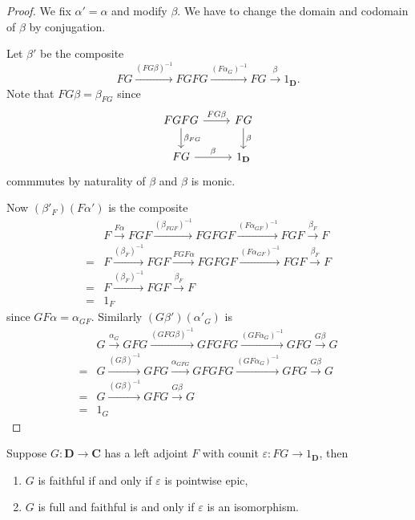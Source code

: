\documentclass[a4paper]{article}
\renewcommand{\c}[1]{\mathbf{#1}}
\begin{document}
\begin{proof}
  We fix \(\alpha' = \alpha\) and modify \(\beta\). We have to change the domain and codomain of \(\beta\) by conjugation.

  Let \(\beta'\) be the composite
  \[
    FG \xrightarrow{(FG\beta)^{-1}} FGFG \xrightarrow{(F\alpha_G)^{-1}} FG \xrightarrow{\beta} 1_{\c D}.
  \]
  Note that \(FG\beta = \beta_{FG}\) since
  \[
    \begin{tikzcd}
      FGFG \ar[r, "FG\beta"] \ar[d, "\beta_{FG}"] & FG \ar[d, "\beta"] \\
      FG \ar[r, "\beta"] & 1_{\c D}
    \end{tikzcd}
  \]
  commmutes by naturality of \(\beta\) and \(\beta\) is monic.

  Now \((\beta'_F)(F\alpha')\) is the composite
   \begin{align*}
     &F \xrightarrow{F\alpha} FGF \xrightarrow{(\beta_{FGF})^{-1}} FGFGF \xrightarrow{(F\alpha_{GF})^{-1}} FGF \xrightarrow{\beta_F} F \\
     =& F \xrightarrow{(\beta_F)^{-1}} FGF \xrightarrow{FGF\alpha} FGFGF \xrightarrow{(F\alpha_{GF})^{-1}} FGF \xrightarrow{\beta_F} F \\
     =& F \xrightarrow{(\beta_F)^{-1}} FGF \xrightarrow{\beta_F} F \\
     =& 1_F
   \end{align*}
  since \(GF \alpha = \alpha_{GF}\). Similarly \((G\beta')(\alpha'_G)\) is
  \begin{align*}
    &G \xrightarrow{\alpha_G} GFG \xrightarrow{(GFG\beta)^{-1}} GFGFG \xrightarrow{(GF\alpha_G)^{-1}} GFG \xrightarrow{G\beta} G \\
    =& G \xrightarrow{(G\beta)^{-1}} GFG \xrightarrow{\alpha_{GFG}} GFGFG \xrightarrow{(GF\alpha_G)^{-1}} GFG \xrightarrow{G\beta} G \\
    =& G \xrightarrow{(G\beta)^{-1}} GFG \xrightarrow{G\beta} G \\
    =& 1_G
  \end{align*}
\end{proof}

\begin{lemma}
  Suppose \(G: \c D \to \c C\) has a left adjoint \(F\) with counit \(\varepsilon: FG \to 1_{\c D}\), then
  \begin{enumerate}
  \item \(G\) is faithful if and only if \(\varepsilon\) is pointwise epic,
  \item \(G\) is full and faithful is and only if \(\varepsilon\) is an isomorphism.
  \end{enumerate}
\end{lemma}
\end{document}
